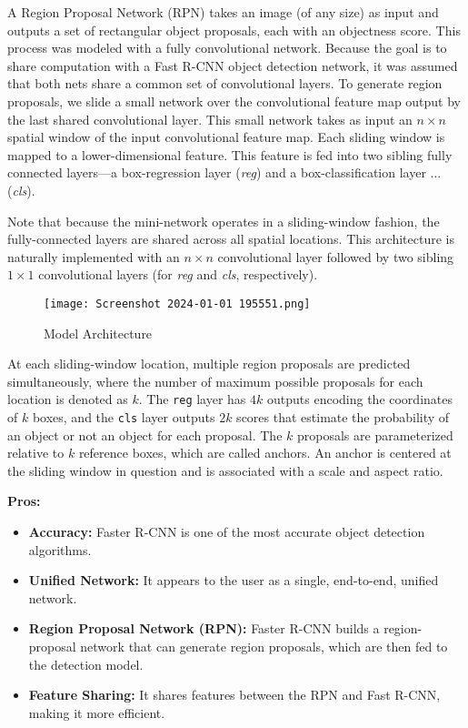 \documentclass{article}
\begin{document}
A Region Proposal Network (RPN) takes an image (of any size) as input and outputs a set of rectangular object proposals, each with an objectness score. This process was modeled with a fully convolutional network. Because the goal is to share computation with a Fast R-CNN object detection network, it was assumed that both nets share a common set of convolutional layers. To generate region proposals, we slide a small network over the convolutional feature map output by the last shared convolutional layer. This small network takes as input an $n \times n$ spatial window of the input convolutional feature map. Each sliding window is mapped to a lower-dimensional feature. This feature is fed into two sibling fully connected layers—a box-regression layer (\textit{reg}) and a box-classification layer \cite{carion2020endtoend}...  (\textit{cls}).

Note that because the mini-network operates in a sliding-window fashion, the fully-connected layers are shared across all spatial locations. This architecture is naturally implemented with an $n \times n$ convolutional layer followed by two sibling $1 \times 1$ convolutional layers (for \textit{reg} and \textit{cls}, respectively).


\begin{figure}[H]
  \centering
  \texttt{[image: Screenshot 2024-01-01 195551.png]} %
  \caption{Model Architecture}
  \label{fig:example}
\end{figure}



At each sliding-window location, multiple region proposals are predicted simultaneously, where the number of maximum possible proposals for each location is denoted as \(k\). The \texttt{reg} layer has \(4k\) outputs encoding the coordinates of \(k\) boxes, and the \texttt{cls} layer outputs \(2k\) scores that estimate the probability of an object or not an object for each proposal. The \(k\) proposals are parameterized relative to \(k\) reference boxes, which are called anchors. An anchor is centered at the sliding window in question and is associated with a scale and aspect ratio.

\textbf{Pros:}
\begin{itemize}
  \item \textbf{Accuracy:} Faster R-CNN is one of the most accurate object detection algorithms.
  \item \textbf{Unified Network:} It appears to the user as a single, end-to-end, unified network.
  \item \textbf{Region Proposal Network (RPN):} Faster R-CNN builds a region-proposal network that can generate region proposals, which are then fed to the detection model.
  \item \textbf{Feature Sharing:} It shares features between the RPN and Fast R-CNN, making it more efficient.
\end{itemize}
\end{document}
